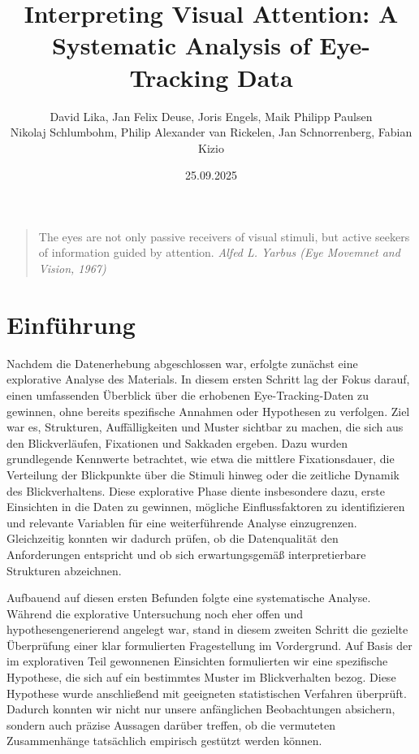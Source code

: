 \documentclass[
    language=german, %
    thesis=seminar, %
    supervisor=postdoc, %
    multiauthor=true, %
    ]{settings/csssa-thesis}
\title{Interpreting Visual Attention: A Systematic Analysis of Eye-Tracking Data}
\author{David Lika, Jan Felix Deuse, Joris Engels, Maik Philipp Paulsen \\
 Nikolaj Schlumbohm, Philip Alexander van Rickelen, Jan Schnorrenberg, Fabian Kizio}
\date{25.09.2025}
\begin{document}
\maketitlepage
\maketitle

\begin{quote}
    The eyes are not only passive receivers of visual stimuli, but active seekers of information guided by attention.
    {\textit{Alfed L. Yarbus (Eye Movemnet and Vision, 1967)}}
\end{quote}

\begin{abstract}
    \lipsum[1]
\end{abstract}

\section{Einführung}

Nachdem die Datenerhebung abgeschlossen war, erfolgte zunächst eine explorative Analyse des Materials.
In diesem ersten Schritt lag der Fokus darauf, einen umfassenden Überblick über die erhobenen Eye-Tracking-Daten zu gewinnen,
ohne bereits spezifische Annahmen oder Hypothesen zu verfolgen. 
Ziel war es, Strukturen, Auffälligkeiten und Muster sichtbar zu machen, die sich aus den Blickverläufen,
Fixationen und Sakkaden ergeben. Dazu wurden grundlegende Kennwerte betrachtet, wie etwa die mittlere Fixationsdauer,
die Verteilung der Blickpunkte über die Stimuli hinweg oder die zeitliche Dynamik des Blickverhaltens.
Diese explorative Phase diente insbesondere dazu, erste Einsichten in die Daten zu gewinnen,
mögliche Einflussfaktoren zu identifizieren und relevante Variablen für eine weiterführende Analyse einzugrenzen.
Gleichzeitig konnten wir dadurch prüfen, ob die Datenqualität den Anforderungen entspricht und ob sich erwartungsgemäß
interpretierbare Strukturen abzeichnen. 

Aufbauend auf diesen ersten Befunden folgte eine systematische Analyse.
Während die explorative Untersuchung noch eher offen und hypothesengenerierend angelegt war,
stand in diesem zweiten Schritt die gezielte Überprüfung einer klar formulierten Fragestellung im Vordergrund.
Auf Basis der im explorativen Teil gewonnenen Einsichten formulierten wir eine spezifische Hypothese,
die sich auf ein bestimmtes Muster im Blickverhalten bezog. Diese Hypothese wurde anschließend mit geeigneten
statistischen Verfahren überprüft. Dadurch konnten wir nicht nur unsere anfänglichen Beobachtungen absichern,
sondern auch präzise Aussagen darüber treffen, ob die vermuteten Zusammenhänge tatsächlich empirisch gestützt werden können. 
\end{document}
